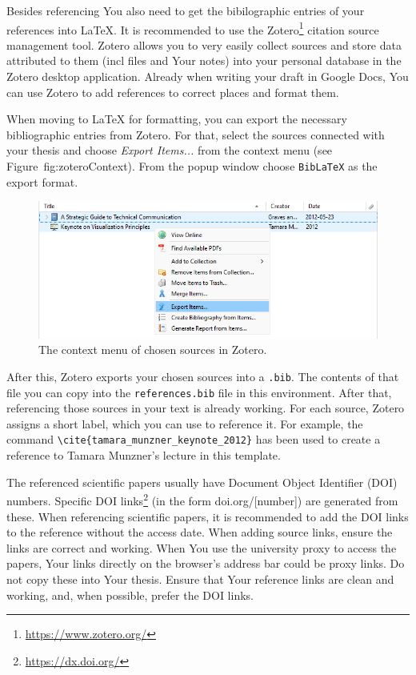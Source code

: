 Besides referencing You also need to get the bibilographic entries of your references into LaTeX. It is recommended to use the Zotero\footnote{\url{https://www.zotero.org/}} citation source management tool. Zotero allows you to very easily collect sources and store data attributed to them (incl files and Your notes) into your personal database in the Zotero desktop application. Already when writing your draft in Google Docs, You can use Zotero to add references to correct places and format them.

When moving to LaTeX for formatting, you can export the necessary bibliographic entries from Zotero. For that, select the sources connected with your thesis and choose \emph{Export Items...} from the context menu (see Figure~{fig:zoteroContext}). From the popup window choose \verb|BibLaTeX| as the export format.

\begin{figure}[ht]
    \centering
    \includegraphics[width=\textwidth]{figures/Figure3-ZoteroBibliographyExport.png}
    \caption{The context menu of chosen sources in Zotero.}
    \label{fig:zoteroContext}
\end{figure}

After this, Zotero exports your chosen sources into a \verb|.bib|. The contents of that file you can copy into the \verb|references.bib| file in this environment. After that, referencing those sources in your text is already working. For each source, Zotero assigns a short label, which you can use to reference it. For example, the command \verb|\cite{tamara_munzner_keynote_2012}| has been used to create a reference to Tamara Munzner's lecture in this template.

The referenced scientific papers usually have Document Object Identifier (DOI) numbers. Specific DOI links\footnote{\url{https://dx.doi.org/}} (in the form doi.org/[number]) are generated from these. When referencing scientific papers, it is recommended to add the DOI links to the reference without the access date. When adding source links, ensure the links are correct and working. When You use the university proxy to access the papers, Your links directly on the browser’s address bar could be proxy links. Do not copy these into Your thesis. Ensure that Your reference links are clean and working, and, when possible, prefer the DOI links.

